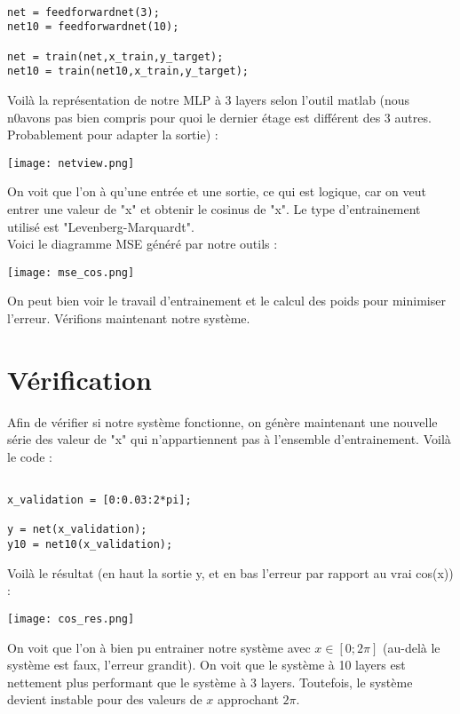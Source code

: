 \begin{lstlisting}[frame=single,style=C]  % Start your code-block

net = feedforwardnet(3);
net10 = feedforwardnet(10);

net = train(net,x_train,y_target);
net10 = train(net10,x_train,y_target);
\end{lstlisting}



Voilà la représentation de notre MLP à 3 layers selon l'outil matlab (nous n0avons pas bien compris pour quoi le dernier étage est différent des 3 autres. Probablement pour adapter la sortie) :

\begin{center} 
\hspace{15cm}
\texttt{[image: netview.png]}
\end{center}
\vspace{0.5cm} 

On voit que l'on à qu'une entrée et une sortie, ce qui est logique, car on veut entrer une valeur de "x" et obtenir le cosinus de "x". Le type d'entrainement utilisé est "Levenberg-Marquardt".\\

Voici le diagramme MSE généré par notre outils : 

\begin{center} 
\hspace{15cm}
\texttt{[image: mse\_cos.png]}
\end{center}
\vspace{1cm}
On peut bien voir le travail d'entrainement et le calcul des poids pour minimiser l'erreur. Vérifions maintenant notre système.
\pagebreak


\section{Vérification}

Afin de vérifier si notre système fonctionne, on génère maintenant une nouvelle série des valeur de "x" qui n'appartiennent pas à l'ensemble d'entrainement. Voilà le code :

\begin{lstlisting}[frame=single,style=C]  % Start your code-block

x_validation = [0:0.03:2*pi];

y = net(x_validation);
y10 = net10(x_validation);
\end{lstlisting}

Voilà le résultat (en haut la sortie y, et en bas l'erreur par rapport au vrai cos(x)) : 
\begin{center} 
\hspace{15cm}
\texttt{[image: cos\_res.png]}
\end{center}
\vspace{1cm}


On voit que l'on à bien pu entrainer notre système avec $x \in [0;2\pi]$ (au-delà le système est faux, l'erreur grandit). On voit que le système à 10 layers est nettement plus performant que le système à 3 layers. Toutefois, le système devient instable pour des valeurs de $x$ approchant $2\pi$.   